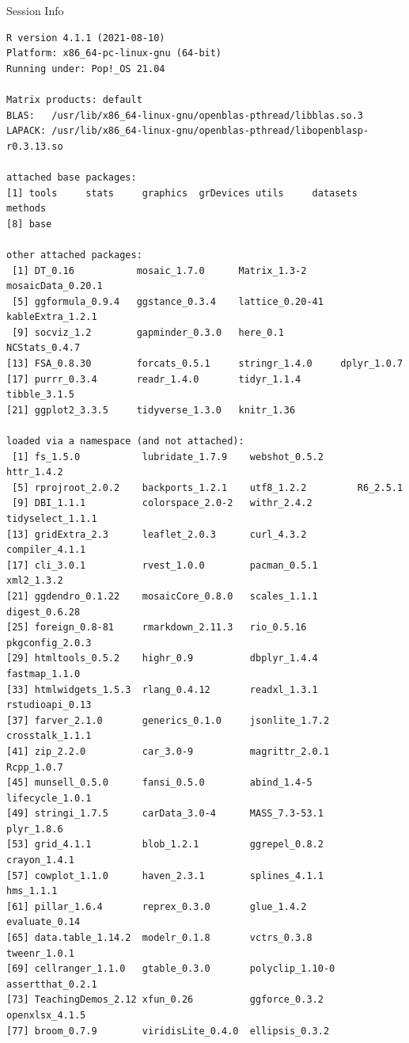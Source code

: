 \documentclass[10pt,handout]{beamer}\usepackage[]{graphicx}\usepackage[]{color}
\makeatletter
\newenvironment{kframe}{%
 \def\at@end@of@kframe{}%
 \ifinner\ifhmode%
  \def\at@end@of@kframe{\end{minipage}}%
  \begin{minipage}{\columnwidth}%
 \fi\fi%
 \def\FrameCommand##1{\hskip\@totalleftmargin \hskip-\fboxsep
 \colorbox{shadecolor}{##1}\hskip-\fboxsep
     \hskip-\linewidth \hskip-\@totalleftmargin \hskip\columnwidth}%
 \MakeFramed {\advance\hsize-\width
   \@totalleftmargin\z@ \linewidth\hsize
   \@setminipage}}%
 {\par\unskip\endMakeFramed%
 \at@end@of@kframe}
\newenvironment{knitrout}{}{} %
\makeatother
\begin{document}
\begin{frame}[fragile]{Session Info}
	\tiny
	
\begin{knitrout}\tiny
{}\color{fgcolor}\begin{kframe}
\begin{verbatim}
R version 4.1.1 (2021-08-10)
Platform: x86_64-pc-linux-gnu (64-bit)
Running under: Pop!_OS 21.04

Matrix products: default
BLAS:   /usr/lib/x86_64-linux-gnu/openblas-pthread/libblas.so.3
LAPACK: /usr/lib/x86_64-linux-gnu/openblas-pthread/libopenblasp-r0.3.13.so

attached base packages:
[1] tools     stats     graphics  grDevices utils     datasets  methods  
[8] base     

other attached packages:
 [1] DT_0.16           mosaic_1.7.0      Matrix_1.3-2      mosaicData_0.20.1
 [5] ggformula_0.9.4   ggstance_0.3.4    lattice_0.20-41   kableExtra_1.2.1 
 [9] socviz_1.2        gapminder_0.3.0   here_0.1          NCStats_0.4.7    
[13] FSA_0.8.30        forcats_0.5.1     stringr_1.4.0     dplyr_1.0.7      
[17] purrr_0.3.4       readr_1.4.0       tidyr_1.1.4       tibble_3.1.5     
[21] ggplot2_3.3.5     tidyverse_1.3.0   knitr_1.36       

loaded via a namespace (and not attached):
 [1] fs_1.5.0           lubridate_1.7.9    webshot_0.5.2      httr_1.4.2        
 [5] rprojroot_2.0.2    backports_1.2.1    utf8_1.2.2         R6_2.5.1          
 [9] DBI_1.1.1          colorspace_2.0-2   withr_2.4.2        tidyselect_1.1.1  
[13] gridExtra_2.3      leaflet_2.0.3      curl_4.3.2         compiler_4.1.1    
[17] cli_3.0.1          rvest_1.0.0        pacman_0.5.1       xml2_1.3.2        
[21] ggdendro_0.1.22    mosaicCore_0.8.0   scales_1.1.1       digest_0.6.28     
[25] foreign_0.8-81     rmarkdown_2.11.3   rio_0.5.16         pkgconfig_2.0.3   
[29] htmltools_0.5.2    highr_0.9          dbplyr_1.4.4       fastmap_1.1.0     
[33] htmlwidgets_1.5.3  rlang_0.4.12       readxl_1.3.1       rstudioapi_0.13   
[37] farver_2.1.0       generics_0.1.0     jsonlite_1.7.2     crosstalk_1.1.1   
[41] zip_2.2.0          car_3.0-9          magrittr_2.0.1     Rcpp_1.0.7        
[45] munsell_0.5.0      fansi_0.5.0        abind_1.4-5        lifecycle_1.0.1   
[49] stringi_1.7.5      carData_3.0-4      MASS_7.3-53.1      plyr_1.8.6        
[53] grid_4.1.1         blob_1.2.1         ggrepel_0.8.2      crayon_1.4.1      
[57] cowplot_1.1.0      haven_2.3.1        splines_4.1.1      hms_1.1.1         
[61] pillar_1.6.4       reprex_0.3.0       glue_1.4.2         evaluate_0.14     
[65] data.table_1.14.2  modelr_0.1.8       vctrs_0.3.8        tweenr_1.0.1      
[69] cellranger_1.1.0   gtable_0.3.0       polyclip_1.10-0    assertthat_0.2.1  
[73] TeachingDemos_2.12 xfun_0.26          ggforce_0.3.2      openxlsx_4.1.5    
[77] broom_0.7.9        viridisLite_0.4.0  ellipsis_0.3.2    
\end{verbatim}
\end{kframe}
\end{knitrout}
	
\end{frame}
\end{document}

